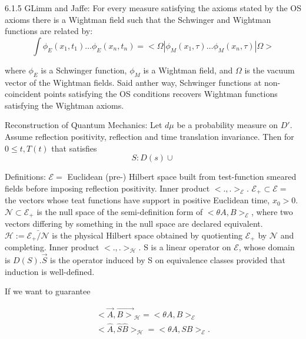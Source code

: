 \documentclass{article}
\begin{document}
6.1.5 GLimm and Jaffe: For every measure satisfying the axioms stated by the OS axioms there is a Wightman field such that the Schwinger and Wightman functions are related by: 
\begin{equation}
    \int \phi_E (x_1, t_1) \ldots \phi_E(x_n, t_n)= < \Omega| \phi_M(x_1, \tau) \ldots \phi_M(x_n, \tau) | \Omega> 
\end{equation}

where $\phi_E$ is a Schwinger function, $\phi_M$ is a Wightman field, and $\Omega$ is the vacuum vector of the Wightman fields. Said anther way, Schwinger functions at non-coincident points satisfying the OS conditions recovers Wightman functions satisfying the Wightman axioms.

 

Reconstruction of Quantum Mechanics: Let $d \mu$ be a probability measure on $D'$. Assume reflection positivity, reflection and time translation invariance. Then for $0 \leq t , T(t) $ that satisfies 
\begin{equation}
S: D(s) \cup 
\end{equation}

Definitions: $\mathcal{E}=$ Euclidean (pre-) Hilbert space built from test-function smeared fields before imposing reflection positivity. Inner product $< .,.>_{\mathcal{E}}$. $\mathcal{E}_+ \subset \mathcal{E}=$ the vectors whose teat functions have support in positive Euclidean time, $x_0 > 0$. $\mathcal{N} \subset \mathcal{E}_+$ is the null space of the semi-definition form of $< \theta A, B> _{\mathcal{E}}$, where two vectors differing by something in the null space are declared equivalent. $\mathcal{H} := \bar{ \mathcal{E}_{+}/\mathcal{N}}$ is the physical Hilbert space obtained by quotienting $\mathcal{E}_+$ by $\mathcal{N}$ and completing. Inner product $< . , . >_{\mathcal{H}}$. S is a linear operator on $\mathcal{E}$, whose domain is $D(S)$.$\vec{S}$ is the operator induced by S on equivalence classes provided that induction is well-defined. 

If we want to guarantee 

\begin{equation}
    \begin{split}
        < \vec{A}, \vec{B >}_{\mathcal{H}}= < \theta A, B>_{\mathcal{E}}
        \\
        < \hat{A}, \hat{S} \hat{B}>_{\mathcal{H}}= < \theta A, SB>_{\mathcal{E}}.
    \end{split}
\end{equation}
\end{document}
